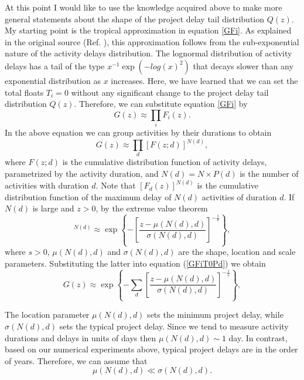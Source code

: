 \documentclass[11pt]{article}
\begin{document}
At this point I would like to use the knowledge acquired above to make more general statements about the shape of the project delay tail distribution $Q(z)$. My starting point is the tropical approximation in equation \ref{GFi}. As explained in the original source (Ref. \cite{vazquez_tropical22}), this approximation follows from the sub-exponential nature of the activity delays distribution. The lognormal distribution of activity delays has a tail of the type $x^{-1}\exp( -log(x)^2)$ that decays slower than any exponential distribution as $x$ increases. Here, we have learned that we can set the total floats $T_i=0$ without any significant change to the project delay tail distribution $Q(z)$. Therefore, we can substitute equation \ref{GFi} by
%
\begin{equation}
G(z) \approx \prod_i  F_i(z).
\label{GFiT0}
\end{equation}
%
In the above equation we can group activities by their durations to obtain
%
\begin{equation}
G(z) \approx \prod_d  [F(z;d)]^{N(d)},
\label{GFiT0Pd}
\end{equation}
%
where $F(z;d)$ is the cumulative distribution function of activity delays, parametrized by the activity duration, and $N(d)=N\times P(d)$ is the number of activities with duration $d$. Note that $[F_d(z)]^{N(d)}$ is the cumulative distribution function of the maximum delay of $N(d)$ activities of duration $d$. If $N(d)$ is large and $z>0$, by the extreme value theorem \cite{resnick87}
%
\begin{equation}
 [F(z;d)]^{N(d)} \approx \exp\left\{ - \left[ \frac{z - \mu(N(d),d)}{\sigma(N(d),d)} \right]^{-\frac{1}{s}} \right\},
\label{Fzlim}
\end{equation}
%
where $s>0$, $\mu(N(d),d)$ and $\sigma(N(d),d)$ are the shape, location and scale parameters. Substituting the latter into equation (\ref{GFiT0Pd}) we obtain 
%
\begin{equation}
G(z) \approx \exp\left\{ - \sum_d \left[ \frac{z - \mu(N(d),d)}{\sigma(N(d),d)} \right]^{-\frac{1}{s}} \right\},
\label{Gzlim}
\end{equation}


The location parameter $\mu(N(d),d)$ sets the minimum project delay, while $\sigma(N(d),d)$ sets the typical project delay. Since we tend to measure activity durations and delays in units of days then $\mu(N(d),d) \sim 1$ day. In contrast, based on our numerical experiments above, typical project delays are in the order of years. Therefore, we can assume that
%
\begin{equation}
\mu(N(d),d)\ll \sigma(N(d),d).
\label{mu_sigma}
\end{equation}
\end{document}
